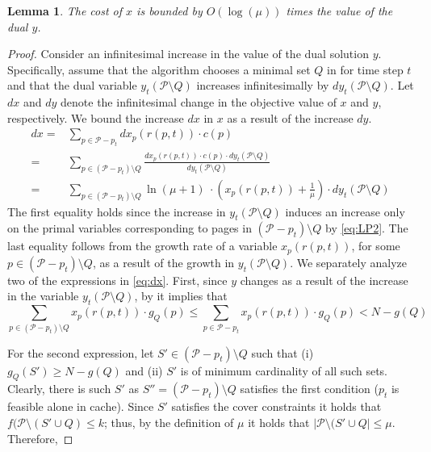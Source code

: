 \documentclass[11pt]{article}
\newcommand{\cP}{{\mathcal{P}}}
\newtheorem{lemma}[thm]{Lemma}
\begin{document}
%
	\begin{lemma}
	\label{thm:logL1}
The cost of $x$ is bounded by $O(\log (\mu))$ times the value of the dual $y$. 
\end{lemma}

\begin{proof}
	Consider an infinitesimal increase in the value of the dual solution $y$. Specifically, assume that the algorithm chooses a minimal set $Q$ in  for time step $t$ and that the dual variable $y_t(\cP \setminus Q)$ increases infinitesimally by $d y_t(\cP \setminus Q)$. Let $dx$ and $dy$ denote the infinitesimal change in the objective value of $x$ and $y$, respectively. We bound the increase $dx$ in $x$ as a result of the increase $dy$.   
\begin{equation}
	\label{eq:dx}
	\begin{aligned}
		dx ={} & \sum_{p \in \cP-p_t} d x_p(r(p,t)) \cdot c(p) \\
		={} & \sum_{p \in (\cP-p_t) \setminus Q}  \frac{d x_p(r(p,t)) \cdot c(p) \cdot d y_t(\cP \setminus Q)}{d y_t(\cP \setminus Q)} \\
		={} & \sum_{p \in (\cP-p_t) \setminus Q} \ln \left(\mu+1 \right)\ \cdot \left( x_p(r(p,t))+\frac{1}{\mu} \right) \cdot d y_t(\cP \setminus Q)
	\end{aligned}
\end{equation} The first equality holds since the increase in $y_t(\cP \setminus Q)$ induces an increase only on the primal variables corresponding to pages in $(\cP-p_t) \setminus Q$ by \eqref{eq:LP2}. The last equality follows from the growth rate of a variable $x_p(r(p,t))$, for some $p \in \left(\cP-p_t\right) \setminus Q$, as a result of the growth in $y_t(\cP \setminus Q)$. %
We separately analyze two of the expressions in \eqref{eq:dx}. First, since $y$ changes as a result of the increase in the variable $y_t(\cP \setminus Q)$, by  it implies that 
\begin{equation}
	\label{eq:InwhileF}
	\sum_{p \in \left(\cP-p_t\right) \setminus Q} x_p(r(p,t)) \cdot g_Q(p) \leq 	\sum_{p \in \cP-p_t} x_p(r(p,t)) \cdot g_Q(p) < N-g(Q)
\end{equation} %


For the second expression, let $S' \in \left(\cP-p_t\right) \setminus Q$ such that (i) $g_Q(S') \geq N-g(Q)$ and (ii) $S'$ is of minimum cardinality of all such sets. Clearly, there is such $S'$ as $S'' = \left(\cP-p_t\right) \setminus Q$ satisfies the first condition ($p_t$ is feasible alone in cache). Since $S'$ satisfies the cover constraints it holds that $f(\cP \setminus (S' \cup Q) \leq k$; thus, by the definition of $\mu$ it holds that $|\cP \setminus (S' \cup Q| \leq \mu$. Therefore,  
	



\end{proof}
\end{document}
